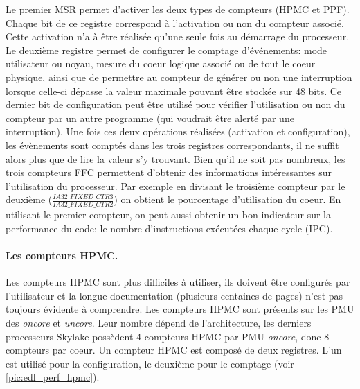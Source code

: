         Le premier MSR permet d'activer les deux types de compteurs (HPMC et PPF). Chaque bit de ce registre correspond à l'activation ou non du compteur associé. Cette activation n'a à être réalisée qu'une seule fois au démarrage du processeur. Le deuxième registre permet de configurer le comptage d'événements: mode utilisateur ou noyau, mesure du coeur logique associé ou de tout le coeur physique, ainsi que de permettre au compteur de générer ou non une interruption lorsque celle-ci dépasse la valeur maximale pouvant être stockée sur 48 bits. Ce dernier bit de configuration peut être utilisé pour vérifier l'utilisation ou non du compteur par un autre programme (qui voudrait être alerté par une interruption). Une fois ces deux opérations réalisées (activation et configuration), les évènements sont comptés dans les trois registres correspondants, il ne suffit alors plus que de lire la valeur s'y trouvant. Bien qu'il ne soit pas nombreux, les trois compteurs FFC permettent d'obtenir des informations intéressantes sur l'utilisation du processeur. Par exemple en divisant le troisième compteur par le deuxième ($\frac{IA32\_FIXED\_CTR3}{IA32\_FIXED\_CTR2}$) on obtient le pourcentage d'utilisation du coeur. En utilisant le premier compteur, on peut aussi obtenir un bon indicateur sur la performance du code: le nombre d'instructions exécutées chaque cycle (IPC).
        
       
        
        
        \paragraph{Les compteurs HPMC.} Les compteurs HPMC sont plus difficiles à utiliser, ils doivent être configurés par l'utilisateur et la longue documentation (plusieurs centaines de pages) n'est pas toujours évidente à comprendre. Les compteurs HPMC sont présents sur les PMU des \textit{oncore} et \textit{uncore}. Leur nombre dépend de l'architecture, les derniers processeurs Skylake possèdent 4 compteurs HPMC par PMU \textit{oncore}, donc 8 compteurs par coeur. Un compteur HPMC est composé de deux registres. L'un est utilisé pour la configuration, le deuxième pour le comptage (voir \autoref{pic:edl_perf_hpmc}).
        

